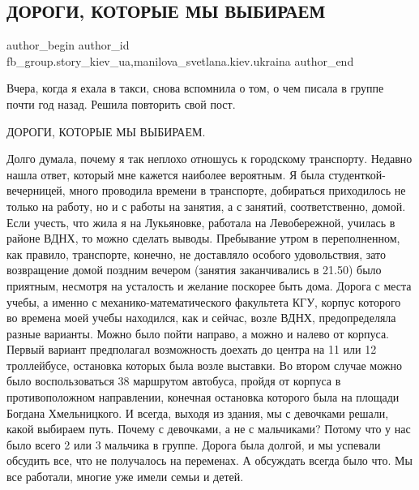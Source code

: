 
 
 
 
 
 
\subsection{ДОРОГИ, КОТОРЫЕ МЫ ВЫБИРАЕМ}
\label{sec:06_12_2021.fb.fb_group.story_kiev_ua.1.dorogi_kotoryje_my_vybirajem}
 
\ifcmt
 author_begin
   author_id fb_group.story_kiev_ua,manilova_svetlana.kiev.ukraina
 author_end
\fi

Вчера, когда я ехала в такси, снова вспомнила о том, о чем писала в группе
почти год назад. Решила повторить свой пост.

ДОРОГИ, КОТОРЫЕ МЫ ВЫБИРАЕМ.

Долго думала, почему я так неплохо отношусь к городскому транспорту. Недавно
нашла ответ, который мне кажется наиболее вероятным. Я была
студенткой-вечерницей, много проводила времени в транспорте, добираться
приходилось не только на работу, но и с работы на занятия, а с занятий,
соответственно, домой. Если учесть, что жила я на Лукьяновке, работала на
Левобережной, училась в районе ВДНХ, то можно сделать выводы. Пребывание утром
в переполненном, как правило, транспорте, конечно, не доставляло особого
удовольствия, зато возвращение домой поздним вечером (занятия заканчивались в
21.50) было приятным, несмотря на усталость и желание поскорее быть дома.
Дорога с места учебы, а именно с механико-математического факультета КГУ,
корпус которого во времена моей учебы находился, как и сейчас, возле ВДНХ,
предопределяла разные варианты. Можно было пойти направо, а можно и налево от
корпуса. Первый вариант предполагал возможность доехать до центра на 11 или 12
троллейбусе, остановка которых была возле выставки. Во втором случае можно было
воспользоваться 38 маршрутом автобуса, пройдя от корпуса в противоположном
направлении, конечная остановка которого была на площади Богдана Хмельницкого.
И всегда, выходя из здания, мы с девочками решали, какой выбираем путь. Почему
с девочками, а не с мальчиками? Потому что у нас было всего 2 или 3 мальчика в
группе. Дорога была долгой, и мы успевали обсудить все, что не получалось на
переменах. А обсуждать всегда было что. Мы все работали, многие уже имели семьи
и детей. 


